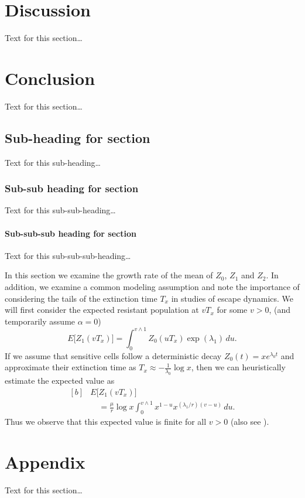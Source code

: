 \documentclass{bmcart}
\begin{document}
\newpage

	\section*{Discussion}
	Text for this section\ldots
	\section*{Conclusion}
	Text for this section\ldots
	\subsection*{Sub-heading for section}
	Text for this sub-heading\ldots
	\subsubsection*{Sub-sub heading for section}
	Text for this sub-sub-heading\ldots
	\paragraph*{Sub-sub-sub heading for section}
	Text for this sub-sub-sub-heading\ldots
	
	In this section we examine the growth rate of the mean of $Z_0$, $Z_1$ and $Z_2$. In
	addition, we examine a common modeling assumption and note the
	importance of considering the tails of the extinction time $T_x$ in
	studies of escape dynamics.
	We will first consider the expected resistant population at $vT_x$ for
	some $v>0$, (and temporarily assume $\alpha=0$)
	\[
	E \bigl[Z_1(vT_x) \bigr]=
	\int_0^{v\wedge
		1}Z_0(uT_x)
	\exp (\lambda_1)\,du .
	\]
	If we assume that sensitive cells follow a deterministic decay
	$Z_0(t)=xe^{\lambda_0 t}$ and approximate their extinction time as
	$T_x\approx-\frac{1}{\lambda_0}\log x$, then we can heuristically
	estimate the expected value as
	\begin{equation}\label{eqexpmuts}
		\begin{aligned}[b]
			&      E\bigl[Z_1(vT_x)\bigr]\\
			&\quad      = \frac{\mu}{r}\log x
			\int_0^{v\wedge1}x^{1-u}x^{({\lambda_1}/{r})(v-u)}\,du .
		\end{aligned}
	\end{equation}
	Thus we observe that this expected value is finite for all $v>0$ (also see \cite{koon,xjon,marg,schn,koha,issnic}).
	
	
	\section*{Appendix}
	Text for this section\ldots
	
\end{document}
